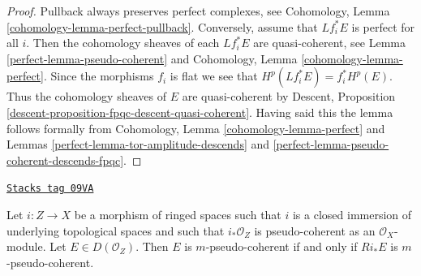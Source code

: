 \begin{proof}

Pullback always preserves perfect complexes, see
Cohomology, Lemma \ref{cohomology-lemma-perfect-pullback}.
Conversely, assume that $Lf_i^*E$ is perfect for all $i$.
Then the cohomology sheaves of each $Lf_i^*E$ are quasi-coherent, see
Lemma \ref{perfect-lemma-pseudo-coherent}
and
Cohomology, Lemma \ref{cohomology-lemma-perfect}.
Since the morphisms $f_i$ is flat we see that $H^p(Lf_i^*E) = f_i^*H^p(E)$.
Thus the cohomology sheaves of $E$ are quasi-coherent by
Descent, Proposition \ref{descent-proposition-fpqc-descent-quasi-coherent}.
Having said this the lemma follows formally from
Cohomology, Lemma \ref{cohomology-lemma-perfect}
and
Lemmas \ref{perfect-lemma-tor-amplitude-descends} and
\ref{perfect-lemma-pseudo-coherent-descends-fpqc}.
\end{proof}

\begin{lemma}
\label{perfect-lemma-closed-push-pseudo-coherent}
\href{https://stacks.math.columbia.edu/tag/09VA}{\texttt{Stacks tag 09VA}}

Let $i : Z \to X$ be a morphism of ringed spaces such that
$i$ is a closed immersion of underlying topological spaces and such that
$i_*\mathcal{O}_Z$ is pseudo-coherent as an $\mathcal{O}_X$-module.
Let $E \in D(\mathcal{O}_Z)$. Then $E$ is $m$-pseudo-coherent
if and only if $Ri_*E$ is $m$-pseudo-coherent.
\end{lemma}

